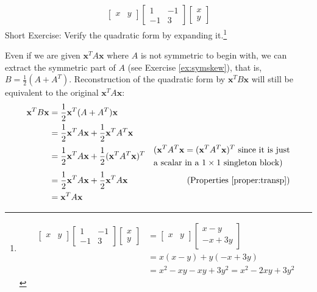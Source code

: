 \begin{align*}
\begin{bmatrix}
x & y
\end{bmatrix}
\begin{bmatrix}
1 & -1 \\
-1 & 3
\end{bmatrix}
\begin{bmatrix}
x \\
y
\end{bmatrix}
\end{align*}
Short Exercise: Verify the quadratic form by expanding it.\footnote{\begin{align*}
\begin{bmatrix}
x & y
\end{bmatrix}
\begin{bmatrix}
1 & -1 \\
-1 & 3
\end{bmatrix}
\begin{bmatrix}
x \\
y
\end{bmatrix} 
&= 
\begin{bmatrix}
x & y
\end{bmatrix}
\begin{bmatrix}
x - y \\
-x + 3y
\end{bmatrix} \\
&= x(x-y) + y(-x+3y) \\
&= x^2 - xy - xy + 3y^2 = x^2 - 2xy + 3y^2
\end{align*}} \par
Even if we are given $\textbf{x}^TA\textbf{x}$ where $A$ is not symmetric to begin with, we can extract the symmetric part of $A$ (see Exercise \ref{ex:symskew}), that is, $B = \frac{1}{2}(A + A^T)$. Reconstruction of the quadratic form by $\textbf{x}^TB\textbf{x}$ will still be equivalent to the original $\textbf{x}^TA\textbf{x}$:
\begin{align*}
\textbf{x}^TB\textbf{x} &= \frac{1}{2}\textbf{x}^T(A + A^T)\textbf{x} \\
&= \frac{1}{2}\textbf{x}^TA\textbf{x} + \frac{1}{2}\textbf{x}^TA^T\textbf{x} \\
&= \frac{1}{2}\textbf{x}^TA\textbf{x} + \frac{1}{2}(\textbf{x}^TA^T\textbf{x})^T & \begin{aligned}
&\text{($\textbf{x}^TA^T\textbf{x} = (\textbf{x}^TA^T\textbf{x})^T$ since it is just} \\
&\text{a scalar in a $1 \times 1$ singleton block)}  
\end{aligned} \\
&= \frac{1}{2}\textbf{x}^TA\textbf{x} + \frac{1}{2}\textbf{x}^TA\textbf{x} & \text{(Properties \ref{proper:transp})} \\
&= \textbf{x}^TA\textbf{x}
\end{align*}
